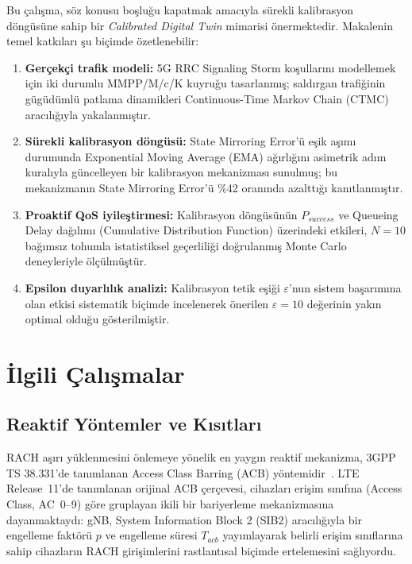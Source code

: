 \documentclass[conference]{IEEEtran}
\begin{document}
Bu çalışma, söz konusu boşluğu kapatmak amacıyla sürekli kalibrasyon döngüsüne
sahip bir \emph{Calibrated Digital Twin} mimarisi önermektedir. Makalenin
temel katkıları şu biçimde özetlenebilir:

\begin{enumerate}

\item \textbf{Gerçekçi trafik modeli:} 5G RRC Signaling Storm koşullarını
modellemek için iki durumlu MMPP/M/c/K kuyruğu tasarlanmış; saldırgan
trafiğinin gügüdümlü patlama dinamikleri Continuous-Time Markov Chain (CTMC)
aracılığıyla yakalanmıştır.

\item \textbf{Sürekli kalibrasyon döngüsü:} State Mirroring Error'ü eşik
aşımı durumunda Exponential Moving Average (EMA) ağırlığını asimetrik adım
kuralıyla güncelleyen bir kalibrasyon mekanizması sunulmuş; bu mekanizmanın
State Mirroring Error'ü \%42 oranında azalttığı kanıtlanmıştır.

\item \textbf{Proaktif QoS iyileştirmesi:} Kalibrasyon döngüsünün
$P_{success}$ ve Queueing Delay dağılımı (Cumulative Distribution Function)
üzerindeki etkileri, $N=10$ bağımsız tohumla istatistiksel geçerliliği
doğrulanmış Monte Carlo deneyleriyle ölçülmüştür.

\item \textbf{Epsilon duyarlılık analizi:} Kalibrasyon tetik eşiği
$\varepsilon$'nun sistem başarımına olan etkisi sistematik biçimde incelenerek
önerilen $\varepsilon=10$ değerinin yakın optimal olduğu gösterilmiştir.

\end{enumerate}

\section{İlgili Çalışmalar}

\subsection{Reaktif Yöntemler ve Kısıtları}

RACH aşırı yüklenmesini önlemeye yönelik en yaygın reaktif mekanizma, 3GPP TS
38.331'de tanımlanan Access Class Barring (ACB) yöntemidir~\cite{b4}. LTE
Release~11'de tanımlanan orijinal ACB çerçevesi, cihazları erişim sınıfına
(Access Class, AC~0--9) göre gruplayan ikili bir bariyerleme mekanizmasına
dayanmaktaydı: gNB, System Information Block 2 (SIB2) aracılığıyla bir
engelleme faktörü $p$ ve engelleme süresi $T_{acb}$ yayımlayarak belirli
erişim sınıflarına sahip cihazların RACH girişimlerini rastlantısal biçimde
ertelemesini sağlıyordu.
\end{document}
